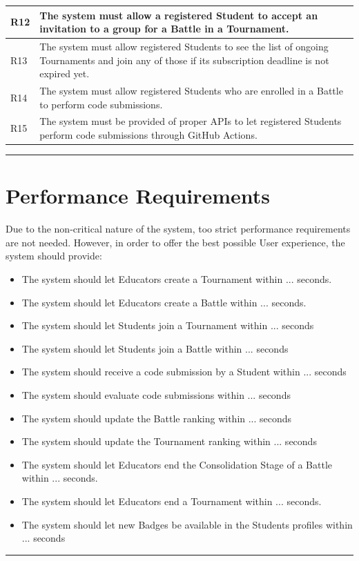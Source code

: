 \documentclass{Configuration_Files/Template}
\begin{document}
\begin{xltabular}{\textwidth}{| l | X |}
\hline
R12 & The system must allow a registered Student to accept an invitation to a group for a Battle in a Tournament.\\ [1ex]
\hline
R13 & The system must allow registered Students to see the list of ongoing Tournaments and join any of those if its subscription deadline is not expired yet.\\ [1ex]
\hline
R14 & The system must allow registered Students who are enrolled in a Battle to perform code submissions.\\ [1ex]
\hline
R15 & The system must be provided of proper APIs to let registered Students perform code submissions through GitHub Actions.\\ [1ex]
\hline
\end{xltabular}

{\color{bluepoli}\rule{\linewidth}{0.1pt}}

\section{Performance Requirements}

Due to the non-critical nature of the system, too strict performance requirements are not needed. 
However, in order to offer the best possible User experience, the system should provide:

\begin{itemize}
\item The system should let Educators create a Tournament within ... seconds.
\item The system should let Educators create a Battle within ... seconds.
\item The system should let Students join a Tournament within ... seconds
\item The system should let Students join a Battle within ... seconds
\item The system should receive a code submission by a Student within ... seconds
\item The system should evaluate code submissions within ... seconds
\item The system should update the Battle ranking within ... seconds
\item The system should update the Tournament ranking within ... seconds
\item The system should let Educators end the Consolidation Stage of a Battle within ... seconds.
\item The system should let Educators end a Tournament within ... seconds.
\item The system should let new Badges be available in the Students profiles within ... seconds\\
\end{itemize}
{\color{bluepoli}\rule{\linewidth}{0.1pt}}
\end{document}
